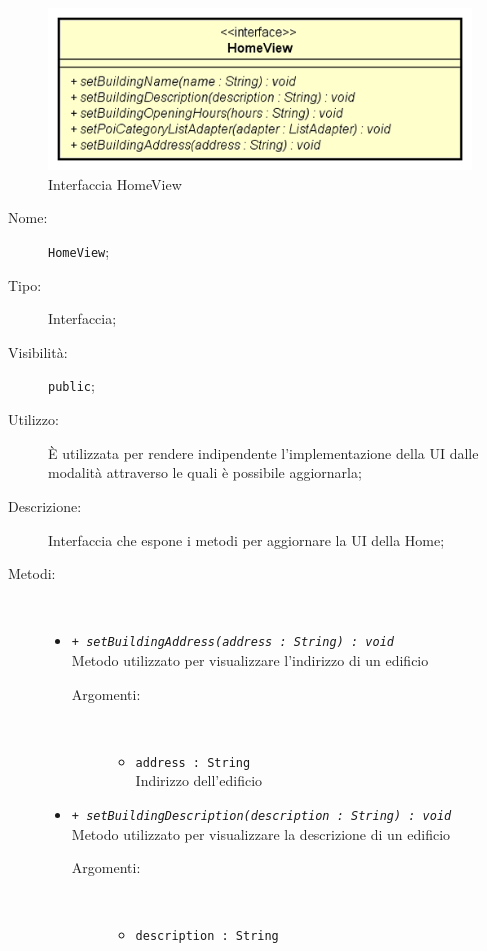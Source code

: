 \documentclass[../DefinizioneDiProdotto.tex]{subfiles}
\begin{document}
    \begin{figure}[H]
        \centering
        \includegraphics{img/HomeView.png}
        \caption{Interfaccia HomeView}\label{fig:view::HomeView} 
    \end{figure}
    \begin{description}
\item[Nome:] \texttt{HomeView};
\item[Tipo:] Interfaccia;
\item[Visibilità:] \texttt{public};
\item[Utilizzo:] È utilizzata per rendere indipendente l'implementazione della UI dalle modalità attraverso le quali è possibile aggiornarla;
\item[Descrizione:] Interfaccia che espone i metodi per aggiornare la UI della Home;
\item[Metodi:] \
\begin{itemize}
\item \texttt{+ \textit{setBuildingAddress(address : String) : void}}\\
Metodo utilizzato per visualizzare l'indirizzo di un edificio
 \begin{description}
\item[Argomenti:] \
\begin{itemize}
\item \texttt{address : String}\\
Indirizzo dell'edificio\end{itemize}
\end{description}
\item \texttt{+ \textit{setBuildingDescription(description : String) : void}}\\
Metodo utilizzato per visualizzare la descrizione di un edificio
 \begin{description}
\item[Argomenti:] \
\begin{itemize}
\item \texttt{description : String}\\

\end{itemize}
\end{description}
\end{itemize}
\end{description}
\end{document}
